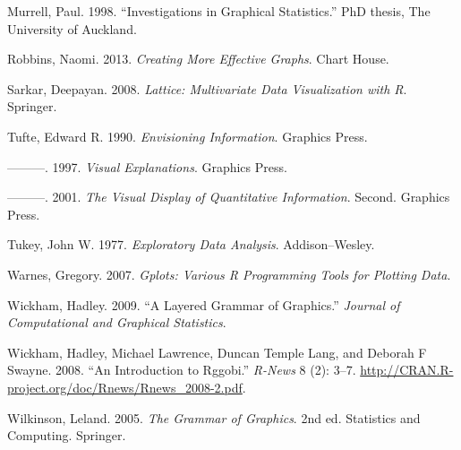 \hypertarget{ref-murrell:1998}{}
Murrell, Paul. 1998. ``Investigations in Graphical Statistics.''
PhD thesis, The University of Auckland.

\hypertarget{ref-robbins:2004}{}
Robbins, Naomi. 2013. \emph{Creating More Effective Graphs}. Chart
House.

\hypertarget{ref-sarkar:2008}{}
Sarkar, Deepayan. 2008. \emph{Lattice: Multivariate Data Visualization
with R}. Springer.

\hypertarget{ref-tufte:1990}{}
Tufte, Edward R. 1990. \emph{Envisioning Information}. Graphics Press.

\hypertarget{ref-tufte:1997}{}
---------. 1997. \emph{Visual Explanations}. Graphics Press.

\hypertarget{ref-tufte:2001}{}
---------. 2001. \emph{The Visual Display of Quantitative Information}.
Second. Graphics Press.

\hypertarget{ref-tukey:1977}{}
Tukey, John W. 1977. \emph{Exploratory Data Analysis}. Addison--Wesley.

\hypertarget{ref-gplots}{}
Warnes, Gregory. 2007. \emph{Gplots: Various R Programming Tools for
Plotting Data}.

\hypertarget{ref-wickham:2007d}{}
Wickham, Hadley. 2009. ``A Layered Grammar of Graphics.'' \emph{Journal
of Computational and Graphical Statistics}.

\hypertarget{ref-wickham:2008b}{}
Wickham, Hadley, Michael Lawrence, Duncan Temple Lang, and Deborah F
Swayne. 2008. ``An Introduction to Rggobi.'' \emph{R-News} 8 (2): 3--7.
\url{http://CRAN.R-project.org/doc/Rnews/Rnews_2008-2.pdf}.

\hypertarget{ref-wilkinson:2006}{}
Wilkinson, Leland. 2005. \emph{The Grammar of Graphics}. 2nd ed.
Statistics and Computing. Springer.
